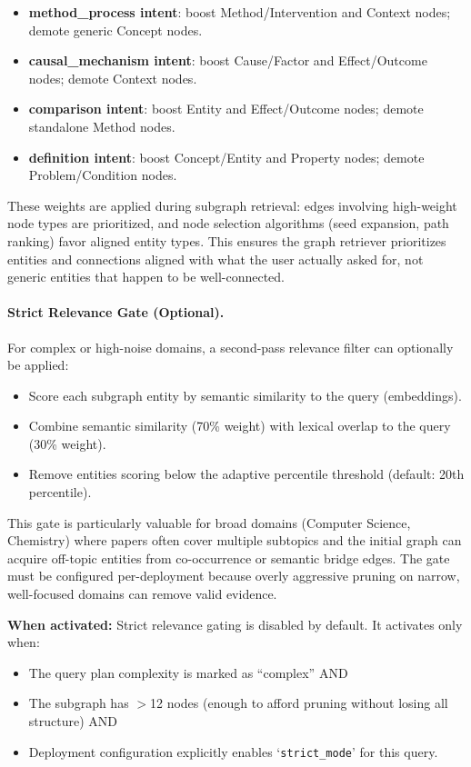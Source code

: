 \documentclass[11pt]{article}
\begin{document}
\begin{itemize}[leftmargin=1.2em]
  \item \textbf{method\_process intent}: boost Method/Intervention and Context nodes; demote generic Concept nodes.
  \item \textbf{causal\_mechanism intent}: boost Cause/Factor and Effect/Outcome nodes; demote Context nodes.
  \item \textbf{comparison intent}: boost Entity and Effect/Outcome nodes; demote standalone Method nodes.
  \item \textbf{definition intent}: boost Concept/Entity and Property nodes; demote Problem/Condition nodes.
\end{itemize}

These weights are applied during subgraph retrieval: edges involving high-weight node types are prioritized, and node selection algorithms (seed expansion, path ranking) favor aligned entity types. This ensures the graph retriever prioritizes entities and connections aligned with what the user actually asked for, not generic entities that happen to be well-connected.

\paragraph{Strict Relevance Gate (Optional).} For complex or high-noise domains, a second-pass relevance filter can optionally be applied:

\begin{itemize}[leftmargin=1.2em]
  \item Score each subgraph entity by semantic similarity to the query (embeddings).
  \item Combine semantic similarity (70\% weight) with lexical overlap to the query (30\% weight).
  \item Remove entities scoring below the adaptive percentile threshold (default: 20th percentile).
\end{itemize}

This gate is particularly valuable for broad domains (Computer Science, Chemistry) where papers often cover multiple subtopics and the initial graph can acquire off-topic entities from co-occurrence or semantic bridge edges. The gate must be configured per-deployment because overly aggressive pruning on narrow, well-focused domains can remove valid evidence.

\textbf{When activated:} Strict relevance gating is disabled by default. It activates only when:
\begin{itemize}[leftmargin=1.2em]
  \item The query plan complexity is marked as ``complex'' AND
  \item The subgraph has $>$12 nodes (enough to afford pruning without losing all structure) AND
  \item Deployment configuration explicitly enables `\texttt{strict\_mode}' for this query.
\end{itemize}
\end{document}
